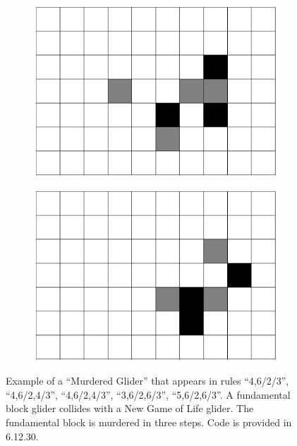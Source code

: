 \documentclass[12pt]{article}
\numberwithin{figure}{section} %
\begin{document}
\begin{figure}[htbp]
\begin{subfigure}{0.23\textwidth}
     	\subcaption{}
   	\end{subfigure}
     	\begin{subfigure}{0.23\textwidth}
     	\centering
     	\includegraphics[width=\linewidth]{Section4/33.2}
     	\subcaption{}
   	\end{subfigure}
        	\begin{subfigure}{0.23\textwidth}
     	\centering
     	\includegraphics[width=\linewidth]{Section4/33.3}
     	\subcaption{}
   	\end{subfigure}
   \caption{Example of a “Murdered Glider” that appears in rules “4,6/2/3”, “4,6/2,4/3”, “4,6/2,4/3”, “3,6/2,6/3”, “5,6/2,6/3”. A fundamental block glider collides with a New Game of Life glider. The fundamental block is murdered in three steps. Code is provided in 6.12.30. }
\end{figure}
\end{document}
